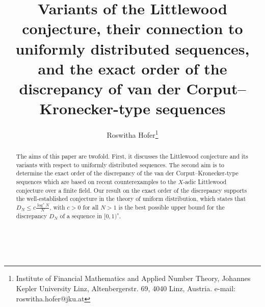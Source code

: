 \documentclass{article}
\renewcommand{\(}{\left (}
\renewcommand{\)}{\right )}
\theoremstyle{definition}
\numberwithin{equation}{section}
\begin{document}
\title{Variants of the Littlewood conjecture, their connection to uniformly distributed sequences, and the exact order of the discrepancy of van der Corput--Kronecker-type sequences}
\author       {Roswitha Hofer\thanks{Institute of Financial Mathematics and Applied Number Theory, Johannes Kepler University Linz, Altenbergerstr. 69, 4040 Linz, Austria. e-mail: roswitha.hofer@jku.at}}




\maketitle


\begin{abstract}The aims of this paper are twofold. First, it discusses the Littlewood conjecture and its variants with respect to uniformly distributed sequences. The second aim is 
to determine the exact order of the discrepancy of the van der Corput--Kronecker-type sequences which are based on recent counterexamples to the $X$-adic Littlewood conjecture over a finite field. Our result on the exact order of the discrepancy supports the well-established conjecture in the theory of uniform distribution, which states that $D_N\leq c \frac{\log^s N}{N}$, with $c>0$ for all $N>1$ is the best possible upper bound for the discrepancy $D_N$ of a sequence in $[0,1)^s$. 
\end{abstract}



%


\\
\end{document}
